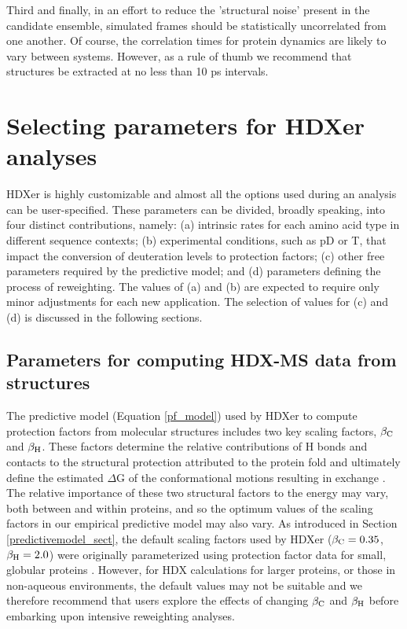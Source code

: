\documentclass[9pt,tutorial,ASAPversion]{livecoms}
\begin{document}
Third and finally, in an effort to reduce the 'structural noise' present in the candidate ensemble, simulated frames should be statistically uncorrelated from one another.
Of course, the correlation times for protein dynamics are likely to vary between systems.
However, as a rule of thumb we recommend that structures be extracted at no less than 10 ps intervals.

\section{Selecting parameters for HDXer analyses}
HDXer is highly customizable and almost all the options used during an analysis can be user-specified. 
These parameters can be divided, broadly speaking, into four distinct contributions, namely: (a) intrinsic rates for each amino acid type in different sequence contexts; (b) experimental conditions, such as pD or T, that impact the conversion of deuteration levels to protection factors; (c) other free parameters required by the predictive model; and (d) parameters defining the process of reweighting. 
The values of (a) and (b) are expected to require only minor adjustments for each new application.
The selection of values for (c) and (d) is discussed in the following sections.

\subsection{Parameters for computing HDX-MS data from structures}\label{choosingbetaparams_sect}
The predictive model (Equation \ref{pf_model}) used by HDXer to compute protection factors from molecular structures includes two key scaling factors, $\beta_\textnormal{C}$ and $\beta_\textnormal{H}$.
These factors determine the relative contributions of H bonds and contacts to the structural protection attributed to the protein fold and ultimately define the estimated $\Delta$G of the conformational motions resulting in exchange \cite{VendruscoloPaci2003, BestVendruscolo2006}.
The relative importance of these two structural factors to the energy may vary, both between and within proteins, and so the optimum values of the scaling factors in our empirical predictive model may also vary.
As introduced in Section \ref{predictivemodel_sect}, the default scaling factors used by HDXer ($\beta_\textnormal{C} = 0.35$, $\beta_\textnormal{H} = 2.0$) were originally parameterized using protection factor data for small, globular proteins \cite{BestVendruscolo2006}.
However, for HDX calculations for larger proteins, or those in non-aqueous environments, the default values may not be suitable and we therefore recommend that users explore the effects of changing $\beta_\textnormal{C}$ and $\beta_\textnormal{H}$ before embarking upon intensive reweighting analyses.
\end{document}
